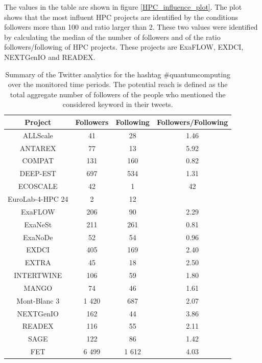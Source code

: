 The values in the table are shown in figure \ref{HPC_influence_plot}. The plot shows that the most influent HPC projects are identified by the conditions followers more than 100 and ratio larger than 2. These two values were identified by calculating the median of the number of followers and of the ratio followers/following of HPC projects. These projects are ExaFLOW, EXDCI, NEXTGenIO and READEX.

\begin{table}[t]
 \begin{center}
 {\scriptsize
  \begin{tabular}{cccc}
   \hline 
   \hline
   Project & Followers & Following & Followers/Following \\ 
   \hline
   \hline
   ALLScale & 41 & 28 & 1.46 \\
   ANTAREX & 77 & 13 & 5.92 \\
   COMPAT & 131 & 160 & 0.82 \\
   DEEP-EST & 697 & 534 & 1.31 \\
   ECOSCALE & 42 & 1 & 42 \\
   EuroLab-4-HPC 24 & 2 & 12 \\
   ExaFLOW & 206 & 90 & 2.29 \\
   ExaNeSt & 211 & 261 & 0.81  \\
   ExaNoDe & 52 & 54 & 0.96 \\
   EXDCI & 405 & 169 & 2.40 \\
   EXTRA & 45 & 18 & 2.50\\
   INTERTWINE & 106 & 59 & 1.80 \\
   MANGO & 74 & 46 & 1.61 \\
   Mont-Blanc 3 & 1 420 & 687 & 2.07 \\
   NEXTGenIO & 162 & 44 & 3.86 \\
   READEX & 116 & 55 & 2.11 \\
   SAGE & 122 & 86 & 1.42 \\ 
   FET & 6 499 & 1 612 & 4.03 \\
   \hline
   \hline
  \end{tabular}
 } 
 \end{center} 
 \caption{Summary of the Twitter analytics for the hashtag \#quantumcomputing over the monitored time periods. The potential reach is defined as the total aggregate number of followers of the people who mentioned the considered keyword in their tweets.}
\label{HPC_influence_table} 
\end{table}

